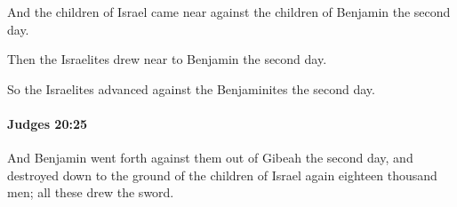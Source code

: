 			\begin{versebox}
					\item[BHS] 
					\item[ASV] And the children of Israel came near against the children of Benjamin the second day.
					\item[NIV] Then the Israelites drew near to Benjamin the second day.
					\item[NRSV] So the Israelites advanced against the Benjaminites the second day.
			\end{versebox}

		\paragraph{Judges 20:25} %
			\label{JUDGES-20-25}

			And Benjamin went forth against them out of Gibeah the second day, and destroyed down to the ground of the children of Israel again eighteen thousand men; all these drew the sword.

